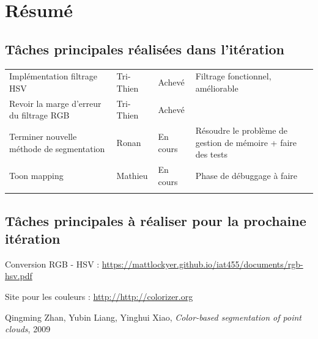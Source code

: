 \documentclass[12pt,titlepage,french]{article}
\begin{document}
\section{Résumé}
\subsection{Tâches principales réalisées dans l'itération}

\noindent\begin{tabu} to \toprule
  &&&\\\toprule
Implémentation filtrage HSV
& Tri-Thien
& Achevé
& Filtrage fonctionnel, améliorable\\\midrule
Revoir la marge d'erreur du filtrage RGB
& Tri-Thien
& Achevé
& \\\midrule
Terminer nouvelle méthode de segmentation
& Ronan
& En cours
& Résoudre le problème de gestion de mémoire + faire des tests \\\midrule
Toon mapping
& Mathieu
& En cours
& Phase de débuggage à faire\\\bottomrule  \\
\end{tabu}

\subsection{Tâches principales à réaliser pour la prochaine itération}

\begin{thebibliography}{3}

 Conversion RGB - HSV : \newline
\url{https://mattlockyer.github.io/iat455/documents/rgb-hsv.pdf}

 Site pour les couleurs : \newline
\url{http://http://colorizer.org}

 Qingming Zhan, Yubin Liang, Yinghui Xiao, \textit{Color-based segmentation of point clouds}, 2009

\end{thebibliography}
\end{document}
